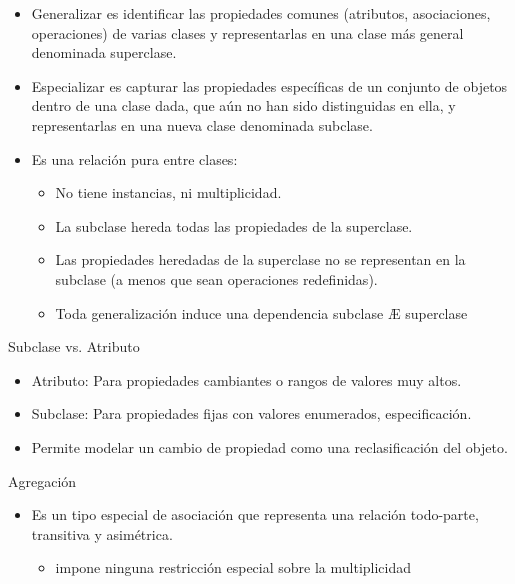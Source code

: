 \documentclass[12pt, twoside, openright]{report} %
\begin{document}
    \begin{itemize}
    
    \item
      Generalizar es identificar las propiedades comunes (atributos,
      asociaciones, operaciones) de varias clases y representarlas en
      una clase más general denominada superclase.
    \item
      Especializar es capturar las propiedades específicas de un conjunto
      de objetos dentro de una clase dada, que aún no han sido
      distinguidas en ella, y representarlas en una nueva clase
      denominada subclase.

	  \item
      Es una relación pura entre clases:

      \begin{itemize}
      
      \item
        No tiene instancias, ni multiplicidad.
      \item
        La subclase hereda todas las propiedades de la superclase.
      \item
        Las propiedades heredadas de la superclase no se representan en
        la subclase (a menos que sean operaciones redefinidas).
      \item
        Toda generalización induce una dependencia subclase Æ superclase
      \end{itemize}
    \end{itemize}

	Subclase vs. Atributo

    \begin{itemize}
    
    \item
      Atributo: Para propiedades cambiantes o rangos de valores muy
      altos.
    \item
      Subclase: Para propiedades fijas con valores enumerados,
      especificación.
    \item
      Permite modelar un cambio de propiedad como una reclasificación
      del objeto.
    \end{itemize}
\pagebreak

	Agregación    \vspace{-0.5cm}

	\begin{figure}[H]
		{\def\svgwidth{.7\textwidth}
  			 }
	\end{figure}
    \begin{itemize}
    \vspace{-0.5cm}
    \item
      Es un tipo especial de asociación que representa una relación
      todo-parte, transitiva y asimétrica.

      \begin{itemize}
      
      \item
        impone ninguna restricción especial sobre la multiplicidad
      \end{itemize}
    \end{itemize}
\end{document}
